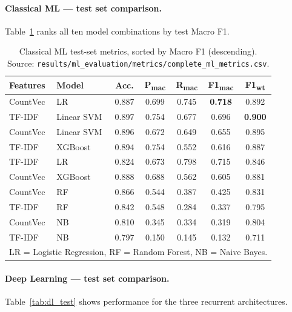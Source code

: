 \documentclass[11pt,a4paper]{article}
\begin{document}
\paragraph{Classical ML --- test set comparison.}

Table~\ref{tab:ml_test} ranks all ten model combinations by test Macro F1.

\begin{table}[h!]
\centering
\caption{Classical ML test-set metrics, sorted by Macro F1 (descending).
         Source: \texttt{results/ml\_evaluation/metrics/complete\_ml\_metrics.csv}.}
\label{tab:ml_test}
\setlength\tabcolsep{4pt}
\begin{tabular}{llccccc}
\toprule
\textbf{Features} & \textbf{Model} &
  \textbf{Acc.} & \textbf{P\textsubscript{mac}} &
  \textbf{R\textsubscript{mac}} & \textbf{F1\textsubscript{mac}} &
  \textbf{F1\textsubscript{wt}} \\
\midrule
CountVec & LR        & 0.887 & 0.699 & 0.745 & \textbf{0.718} & 0.892 \\
TF-IDF   & Linear SVM & 0.897 & 0.754 & 0.677 & 0.696 & \textbf{0.900} \\
CountVec & Linear SVM & 0.896 & 0.672 & 0.649 & 0.655 & 0.895 \\
TF-IDF   & XGBoost   & 0.894 & 0.754 & 0.552 & 0.616 & 0.887 \\
TF-IDF   & LR        & 0.824 & 0.673 & 0.798 & 0.715 & 0.846 \\
CountVec & XGBoost   & 0.888 & 0.688 & 0.562 & 0.605 & 0.881 \\
CountVec & RF        & 0.866 & 0.544 & 0.387 & 0.425 & 0.831 \\
TF-IDF   & RF        & 0.842 & 0.548 & 0.284 & 0.337 & 0.795 \\
CountVec & NB        & 0.810 & 0.345 & 0.334 & 0.319 & 0.804 \\
TF-IDF   & NB        & 0.797 & 0.150 & 0.145 & 0.132 & 0.711 \\
\bottomrule
\multicolumn{7}{l}{\footnotesize LR = Logistic Regression, RF = Random Forest,
  NB = Naive Bayes.}
\end{tabular}
\end{table}

\paragraph{Deep Learning --- test set comparison.}

Table~\ref{tab:dl_test} shows performance for the three recurrent architectures.
\end{document}
